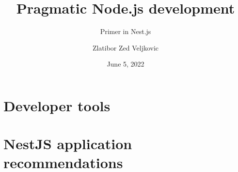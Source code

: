\documentclass[lang=en,color=green]{elegantbook}
\title{Pragmatic Node.js development}
\subtitle{Primer in Nest.js}
\author{Zlatibor Zed Veljkovic}
\date{June 5, 2022}
\begin{document}
    \maketitle
    \frontmatter

    \tableofcontents

    \mainmatter


    \chapter{Developer tools}\label{ch:developer-tools}
    


    \chapter{NestJS application recommendations}\label{ch:nestjs-application-recommendations}
    
\end{document}
